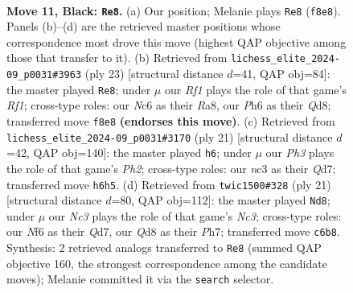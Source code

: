 \documentclass[11pt]{article}
\begin{document}
\clearpage

\begin{figure}[p]\centering
\begin{subfigure}{0.46\textwidth}\centering
\resizebox{\linewidth}{!}{%
\newchessgame
\chessboard[
  setfen={r2q1rk1/1bp1bpp1/p1np1n1p/1p2p3/4P3/PBNP1N1P/1PP2PP1/R1BQR1K1 b - - 0 11},
  showmover=false,
  pgfstyle=straightmove, color=movearrow, markmove={f8-e8}
]}
\caption{}
\end{subfigure}\hfill
\begin{subfigure}{0.46\textwidth}\centering
\resizebox{\linewidth}{!}{%
\newchessgame
\chessboard[
  setfen={r2q1rk1/1bp1bppp/p1np1n2/1p2p3/3PP3/1BP2N1P/PP3PP1/RNBQR1K1 b - - 4 12},
  showmover=false,
  pgfstyle=straightmove, color=movearrow, markmove={f8-e8}
]}
\caption{}
\end{subfigure}
\\[4pt]
\begin{subfigure}{0.46\textwidth}\centering
\resizebox{\linewidth}{!}{%
\newchessgame
\chessboard[
  setfen={r4rk1/1bpqbppp/p1np1n2/1p2p3/4P3/PBNP1N1P/1PP2PP1/R1BQR1K1 b - - 2 11},
  showmover=false,
  pgfstyle=straightmove, color=movearrow, markmove={h7-h6}
]}
\caption{}
\end{subfigure}\hfill
\begin{subfigure}{0.46\textwidth}\centering
\resizebox{\linewidth}{!}{%
\newchessgame
\chessboard[
  setfen={r4rk1/1bpqbppp/p1np1n2/1p2p3/4P3/PB1P1N1P/1PPB1PP1/RN1QR1K1 b - - 0 11},
  showmover=false,
  pgfstyle=straightmove, color=movearrow, markmove={c6-d8}
]}
\caption{}
\end{subfigure}
\caption{\textbf{Move 11, Black: \texttt{Re8}.} (a) Our position; Melanie plays \texttt{Re8} (\texttt{f8e8}). Panels (b)--(d) are the retrieved master positions whose correspondence most drove this move (highest QAP objective among those that transfer to it). (b) Retrieved from \texttt{lichess\_elite\_2024-09\_p0031\#3963} (ply 23) [structural distance $d$=41, QAP obj=84]: the master played \texttt{Re8}; under $\mu$ our \emph{Rf1} plays the role of that game's \emph{Rf1}; cross-type roles: our \emph{N}c6 as their \emph{R}a8, our \emph{P}h6 as their \emph{Q}d8; transferred move \texttt{f8e8} \textbf{(endorses this move)}. (c) Retrieved from \texttt{lichess\_elite\_2024-09\_p0031\#3170} (ply 21) [structural distance $d$=42, QAP obj=140]: the master played \texttt{h6}; under $\mu$ our \emph{Ph3} plays the role of that game's \emph{Ph2}; cross-type roles: our \emph{n}c3 as their \emph{Q}d7; transferred move \texttt{h6h5}. (d) Retrieved from \texttt{twic1500\#328} (ply 21) [structural distance $d$=80, QAP obj=112]: the master played \texttt{Nd8}; under $\mu$ our \emph{Nc3} plays the role of that game's \emph{Nc3}; cross-type roles: our \emph{N}f6 as their \emph{Q}d7, our \emph{Q}d8 as their \emph{P}h7; transferred move \texttt{c6b8}. Synthesis: 2 retrieved analogs transferred to \texttt{Re8} (summed QAP objective 160, the strongest correspondence among the candidate moves); Melanie committed it via the \texttt{search} selector.}
\label{fig:thought-m21}
\end{figure}
\end{document}
